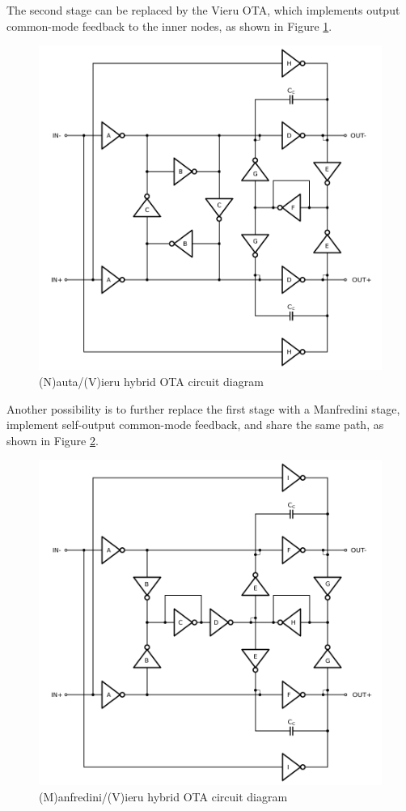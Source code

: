 \documentclass[conference]{IEEEtran}
\begin{document}
The second stage can be replaced by the Vieru OTA, which implements output common-mode feedback to the inner nodes, as shown in Figure \ref{fig:nautavieru:sch}.

\begin{figure}[!htbp]
	\centerline{\includegraphics[scale=0.50]{circuits/nautavieru.pdf}}
	\caption{(N)auta/(V)ieru hybrid OTA circuit diagram}
	\label{fig:nautavieru:sch}
\end{figure}

Another possibility is to further replace the first stage with a Manfredini stage, implement self-output common-mode feedback, and share the same path, as shown in Figure \ref{fig:manfvieru:sch}.

\begin{figure}[!htbp]
	\centerline{\includegraphics[scale=0.50]{circuits/manfvieru.pdf}}
	\caption{(M)anfredini/(V)ieru hybrid OTA circuit diagram}	\label{fig:manfvieru:sch}
\end{figure}
\end{document}
